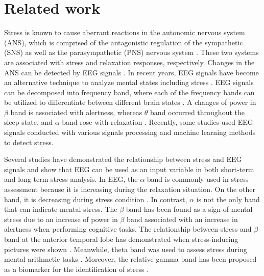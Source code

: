 \documentclass[pdflatex,sn-mathphys]{sn-jnl}%
\theoremstyle{thmstyleone}%
\theoremstyle{thmstyletwo}%
\theoremstyle{thmstylethree}%
\begin{document}

\section{Related work} \label{sec2}
Stress is known to cause aberrant reactions in the autonomic nervous system (ANS), which is comprised of the antagonistic regulation of the sympathetic (SNS) as well as the parasympathetic (PNS) nervous system \cite{Cohen2000, Hughes2000}. These two systems are associated with stress and relaxation responses, respectively. Changes in the ANS can be detected by EEG signals \cite{Seo2010}. In recent years, EEG signals have become an alternative technique to analyze mental states including stress \cite{Awang2011, Hu2015}. EEG signals can be decomposed into frequency band\cite{Kulkarni2020}, where each of the frequency bands can be utilized to differentiate between different brain states \cite{Alshargie-2018}. A changes of power in $\beta$ band is associated with alertness, whereas $\theta$ band occurred throughout the sleep state, and $\alpha$ band rose with relaxation \cite{Wang2014}. Recently, some studies used EEG signals conducted with various signals processing and machine learning methods to detect stress. 

Several studies have demonstrated the relationship between stress and EEG signals and show that EEG can be used as an input variable in both short-term and long-term stress analysis. In EEG, the $\alpha$ band is commonly used in stress assessment because it is increasing during the relaxation situation. On the other hand, it is decreasing during stress condition \cite{Alshargie-2016}. In contrast, $\alpha$ is not the only band that can indicate mental stress. The $\beta$ band has been found as a sign of mental stress due to an increase of power in $\beta$ band associated with an increase in alertness when performing cognitive tasks. The relationship between stress and $\beta$ band at the anterior temporal lobe has demonstrated when stress-inducing pictures were shown \cite{Seo2010, Awang2011, Hamid2010}. Meanwhile, theta band was used to assess stress during mental arithmetic tasks \cite{Grtner2015}. Moreover, the relative gamma band has been proposed as a biomarker for the identification of stress \cite{Arsalan2019}.
\end{document}
